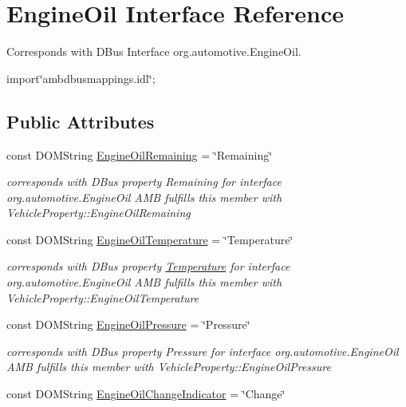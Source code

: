 \hypertarget{interfaceEngineOil}{\section{Engine\+Oil Interface Reference}
\label{interfaceEngineOil}
}


Corresponds with D\+Bus Interface org.\+automotive.\+Engine\+Oil.  




{\ttfamily import\char`\"{}ambdbusmappings.\+idl\char`\"{};}

\subsection*{Public Attributes}
\begin{DoxyCompactItemize}
\item 
const D\+O\+M\+String \hyperlink{interfaceEngineOil_a28a148b5fcbf4d61ab438f229870e997}{Engine\+Oil\+Remaining} = \char`\"{}Remaining\char`\"{}
\begin{DoxyCompactList}\small\item\em corresponds with D\+Bus property Remaining for interface org.\+automotive.\+Engine\+Oil A\+M\+B fulfills this member with Vehicle\+Property\+::\+Engine\+Oil\+Remaining \end{DoxyCompactList}\item 
\hypertarget{interfaceEngineOil_a5b260a98314b5f69eae0411db6318a3f}{const D\+O\+M\+String \hyperlink{interfaceEngineOil_a5b260a98314b5f69eae0411db6318a3f}{Engine\+Oil\+Temperature} = \char`\"{}Temperature\char`\"{}}\label{interfaceEngineOil_a5b260a98314b5f69eae0411db6318a3f}

\begin{DoxyCompactList}\small\item\em corresponds with D\+Bus property \hyperlink{interfaceTemperature}{Temperature} for interface org.\+automotive.\+Engine\+Oil A\+M\+B fulfills this member with Vehicle\+Property\+::\+Engine\+Oil\+Temperature \end{DoxyCompactList}\item 
\hypertarget{interfaceEngineOil_a380dd755fe98983b8128bac94b64b9b5}{const D\+O\+M\+String \hyperlink{interfaceEngineOil_a380dd755fe98983b8128bac94b64b9b5}{Engine\+Oil\+Pressure} = \char`\"{}Pressure\char`\"{}}\label{interfaceEngineOil_a380dd755fe98983b8128bac94b64b9b5}

\begin{DoxyCompactList}\small\item\em corresponds with D\+Bus property Pressure for interface org.\+automotive.\+Engine\+Oil A\+M\+B fulfills this member with Vehicle\+Property\+::\+Engine\+Oil\+Pressure \end{DoxyCompactList}\item 
\hypertarget{interfaceEngineOil_a03d33d32192b81088d1ed52d2f959262}{const D\+O\+M\+String \hyperlink{interfaceEngineOil_a03d33d32192b81088d1ed52d2f959262}{Engine\+Oil\+Change\+Indicator} = \char`\"{}Change\char`\"{}}\label{interfaceEngineOil_a03d33d32192b81088d1ed52d2f959262}


\end{DoxyCompactItemize}
